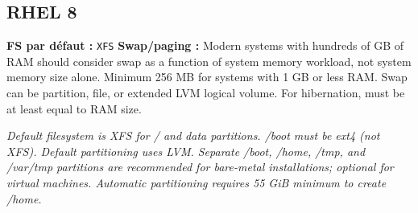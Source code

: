 \documentclass[10pt,a4paper]{article}
\begin{document}
\subsection{RHEL 8}
\noindent\small \textbf{FS par d\'efaut :} \texttt{XFS} \quad\textbullet\quad \textbf{Swap/paging :} Modern systems with hundreds of GB of RAM should consider swap as a function of system memory workload, not system memory size alone. Minimum 256 MB for systems with 1 GB or less RAM. Swap can be partition, file, or extended LVM logical volume. For hibernation, must be at least equal to RAM size.\normalsize\par\smallskip
\noindent\small\textit{Default filesystem is XFS for / and data partitions. /boot must be ext4 (not XFS). Default partitioning uses LVM. Separate /boot, /home, /tmp, and /var/tmp partitions are recommended for bare-metal installations; optional for virtual machines. Automatic partitioning requires 55 GiB minimum to create /home.}\normalsize\par\smallskip
\end{document}
